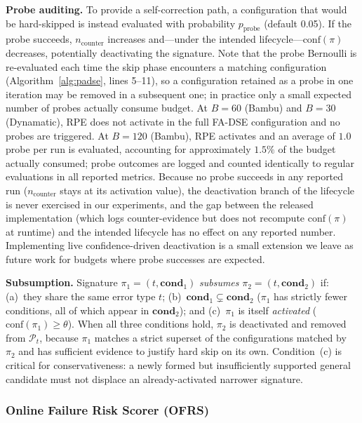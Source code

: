 \documentclass[journal]{IEEEtran}
\begin{document}
\textbf{Probe auditing.} To provide a self-correction path, a configuration that would be hard-skipped is instead evaluated with probability $p_{\text{probe}}$ (default 0.05). If the probe succeeds, $n_{\text{counter}}$ increases and---under the intended lifecycle---$\text{conf}(\pi)$ decreases, potentially deactivating the signature. Note that the probe Bernoulli is re-evaluated each time the skip phase encounters a matching configuration (Algorithm~\ref{alg:padse}, lines 5--11), so a configuration retained as a probe in one iteration may be removed in a subsequent one; in practice only a small expected number of probes actually consume budget. At $B{=}60$ (Bambu) and $B{=}30$ (Dynamatic), RPE does not activate in the full FA-DSE configuration and no probes are triggered. At $B{=}120$ (Bambu), RPE activates and an average of $1.0$ probe per run is evaluated, accounting for approximately $1.5\%$ of the budget actually consumed; probe outcomes are logged and counted identically to regular evaluations in all reported metrics. Because no probe succeeds in any reported run ($n_{\text{counter}}$ stays at its activation value), the deactivation branch of the lifecycle is never exercised in our experiments, and the gap between the released implementation (which logs counter-evidence but does not recompute $\text{conf}(\pi)$ at runtime) and the intended lifecycle has no effect on any reported number. Implementing live confidence-driven deactivation is a small extension we leave as future work for budgets where probe successes are expected.

\textbf{Subsumption.} Signature $\pi_1 = (t, \mathbf{cond}_1)$ \emph{subsumes} $\pi_2 = (t, \mathbf{cond}_2)$ if: (a)~they share the same error type $t$; (b)~$\mathbf{cond}_1 \subsetneq \mathbf{cond}_2$ ($\pi_1$ has strictly fewer conditions, all of which appear in $\mathbf{cond}_2$); and (c)~$\pi_1$ is itself \emph{activated} ($\text{conf}(\pi_1) \geq \theta$). When all three conditions hold, $\pi_2$ is deactivated and removed from $\mathcal{P}_t$, because $\pi_1$ matches a strict superset of the configurations matched by $\pi_2$ and has sufficient evidence to justify hard skip on its own. Condition~(c) is critical for conservativeness: a newly formed but insufficiently supported general candidate must not displace an already-activated narrower signature.

\subsubsection{Online Failure Risk Scorer (OFRS)}
\label{sec:ofrs}
\end{document}
